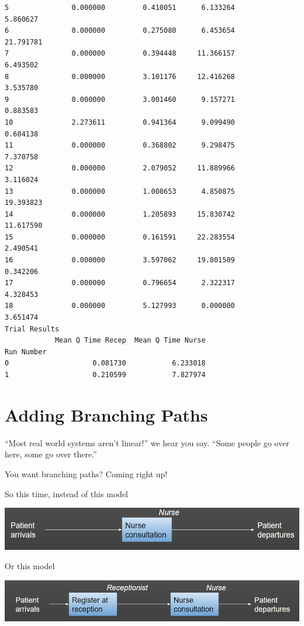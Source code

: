 \documentclass[
  letterpaper,
  DIV=11,
  numbers=noendperiod]{scrreprt}
\begin{document}
\begin{verbatim}
5               0.000000         0.410051      6.133264         5.860627
6               0.000000         0.275080      6.453654        21.791781
7               0.000000         0.394448     11.366157         6.493502
8               0.000000         3.101176     12.416268         3.535780
9               0.000000         3.001460      9.157271         0.883583
10              2.273611         0.941364      9.099490         0.604138
11              0.000000         0.368802      9.298475         7.370758
12              0.000000         2.079052     11.889966         3.116024
13              0.000000         1.008653      4.850875        19.393823
14              0.000000         1.205893     15.830742        11.617590
15              0.000000         0.161591     22.283554         2.490541
16              0.000000         3.597062     19.801509         0.342206
17              0.000000         0.796654      2.322317         4.328453
18              0.000000         5.127993      0.000000         3.651474
Trial Results
            Mean Q Time Recep  Mean Q Time Nurse
Run Number                                      
0                    0.081730           6.233018
1                    0.210599           7.827974
\end{verbatim}

\chapter{Adding Branching Paths}\label{adding-branching-paths}

``Most real world systems aren't linear!'' we hear you say. ``Some
people go over here, some go over there.''

You want branching paths? Coming right up!

So this time, instead of this model

\includegraphics{images/example_simplest_model.png}

Or this model

\includegraphics{images/example_simple_model_sequential.png}
\end{document}
